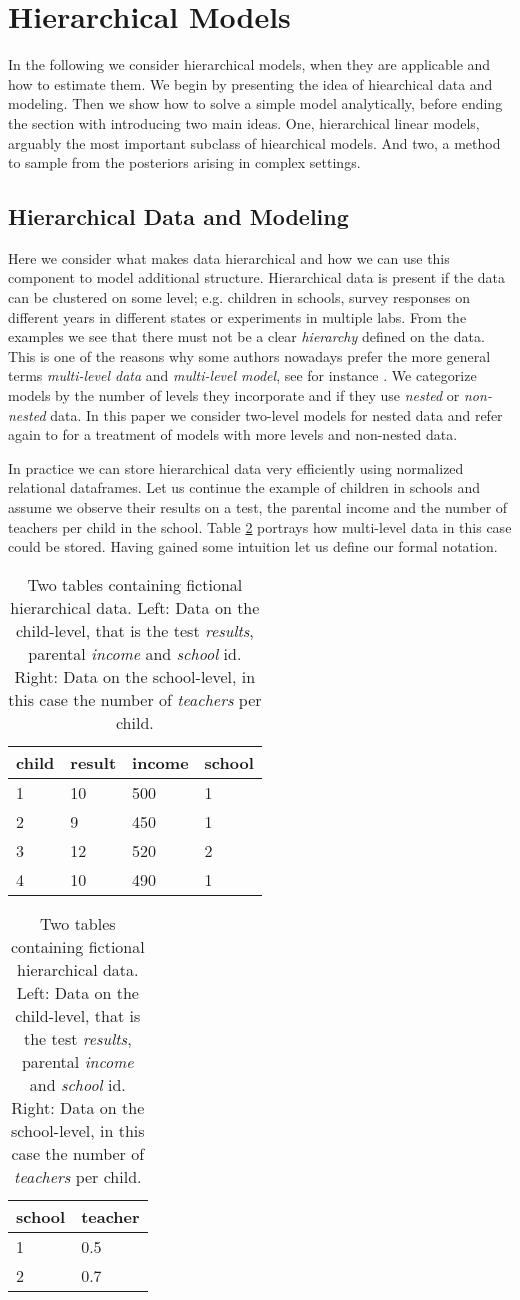 \section{Hierarchical Models}
In the following we consider hierarchical models, when they are applicable and how to estimate them.
We begin by presenting the idea of hiearchical data and modeling.
Then we show how to solve a simple model analytically, before ending the section with introducing two main ideas.
One, hierarchical linear models, arguably the most important subclass of hiearchical models.
And two, a method to sample from the posteriors arising in complex settings.

\subsection{Hierarchical Data and Modeling}
Here we consider what makes data hierarchical and how we can use this component to model additional structure.
Hierarchical data is present if the data can be clustered on some level; e.g. children in schools, survey responses on different years in different states or experiments in multiple labs.
From the examples we see that there must not be a clear \emph{hierarchy} defined on the data.
This is one of the reasons why some authors nowadays prefer the more general terms \emph{multi-level data} and \emph{multi-level model}, see for instance \citet{GelmanHill2007}.
We categorize models by the number of levels they incorporate and if they use \emph{nested} or \emph{non-nested} data.
In this paper we consider two-level models for nested data and refer again to \citet{GelmanHill2007} for a treatment of models with more levels and non-nested data.

In practice we can store hierarchical data very efficiently using normalized relational dataframes. Let us continue the example of children in schools and assume we observe their results on a test, the parental income and the number of teachers per child in the school.
Table \ref{tab:relational_table} portrays how multi-level data in this case could be stored.
Having gained some intuition let us define our formal notation.
\begin{table}[!ht]
\begin{center}
\begin{tabular}{l l l l}
child & result & income & school\\
\hline
1 & 10 & 500 & 1\\
2 & 9 & 450 & 1\\
3 & 12 & 520 & 2\\
4 & 10 & 490 & 1
\end{tabular}
\quad
\begin{tabular}{l l}
school & teacher\\
\hline
1 & 0.5\\
2 & 0.7
\end{tabular}
\end{center}
\caption{Two tables containing fictional hierarchical data. Left: Data on the child-level, that is the test \emph{results}, parental \emph{income} and \emph{school} id. Right: Data on the school-level, in this case the number of \emph{teachers} per child.}
\label{tab:relational_table}
\end{table}

